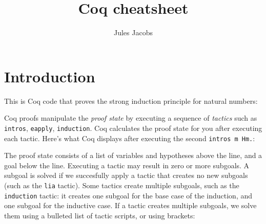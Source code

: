 

\newcommand{\tac}[1]{\lstinline[mathescape]~#1~}
\newcommand{\ciff}{\ \leftrightarrow\ }
\newcommand{\hyp}{\tac{H}}
\newcommand{\hypB}{\tac{G}}
\newcommand{\var}{\tac{x}}
\newcommand{\varB}{\tac{y}}

\title{Coq cheatsheet}
\author{Jules Jacobs}


\maketitle


\section{Introduction}

This is Coq code that proves the strong induction principle for natural numbers:



Coq proofs manipulate the \emph{proof state} by executing a sequence of \emph{tactics} such as \tac{intros}, \tac{eapply}, \tac{induction}.
Coq calculates the proof state for you after executing each tactic.
Here's what Coq displays after executing the second \lstinline|intros m Hm.|:

\begin{minipage}{\textwidth}

\end{minipage}

The proof state consists of a list of variables and hypotheses above the line, and a goal below the line.
Executing a tactic may result in zero or more subgoals. A subgoal is solved if we succesfully apply a tactic that creates no new subgoals (such as the \tac{lia} tactic).
Some tactics create multiple subgoals, such as the \tac{induction} tactic: it creates one subgoal for the base case of the induction, and one subgoal for the inductive case.
If a tactic creates multiple subgoals, we solve them using a bulleted list of tactic scripts, or using brackets:

